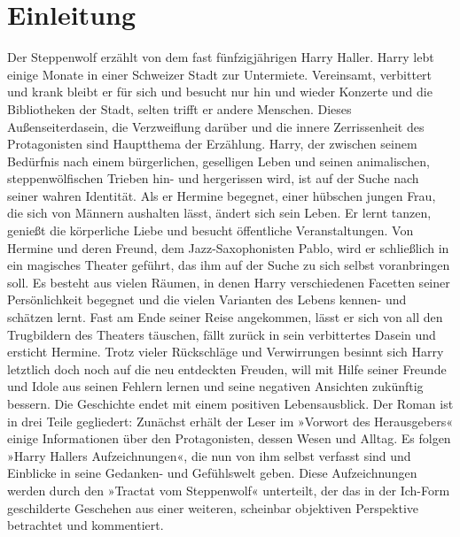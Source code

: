 \documentclass[a4paper,10pt,twocolumn]{article}
\begin{document}
    \section{Einleitung}
    Der Steppenwolf erzählt von dem fast fünfzigjährigen 
    Harry Haller. Harry lebt einige Monate in einer Schweizer Stadt zur Untermiete.
    Vereinsamt, verbittert und krank bleibt er für sich und besucht nur hin und wieder
    Konzerte und die Bibliotheken der Stadt, selten trifft er andere Menschen. Dieses 
    Außenseiterdasein, die Verzweiflung darüber und die innere Zerrissenheit des Protagonisten 
    sind Hauptthema der Erzählung. Harry, der zwischen seinem Bedürfnis nach einem bürgerlichen,
    geselligen Leben und seinen animalischen, steppenwölfischen Trieben hin- und hergerissen wird, 
    ist auf der Suche nach seiner wahren Identität. Als er Hermine begegnet, einer hübschen jungen Frau,
    die sich von Männern aushalten lässt, ändert sich sein Leben. Er lernt tanzen, genießt die körperliche Liebe 
    und besucht öffentliche Veranstaltungen. Von Hermine und deren Freund, dem Jazz-Saxophonisten Pablo,
    wird er schließlich in ein magisches Theater geführt, das ihm auf der Suche zu sich selbst voranbringen soll.
    Es besteht aus vielen Räumen, in denen Harry verschiedenen Facetten seiner Persönlichkeit begegnet und die vielen
    Varianten des Lebens kennen- und schätzen lernt. Fast am Ende seiner Reise angekommen, lässt er sich von all den 
    Trugbildern des Theaters täuschen, fällt zurück in sein verbittertes Dasein und ersticht Hermine.
    Trotz vieler Rückschläge und Verwirrungen besinnt sich Harry letztlich doch noch auf die neu entdeckten Freuden, will mit Hilfe seiner Freunde und Idole aus seinen Fehlern lernen und seine negativen Ansichten zukünftig bessern. Die Geschichte endet mit einem positiven Lebensausblick. Der Roman ist in drei Teile gegliedert: Zunächst erhält der Leser im »Vorwort des Herausgebers« einige Informationen über den Protagonisten, dessen Wesen und Alltag. Es folgen »Harry Hallers Aufzeichnungen«, die nun von ihm selbst verfasst sind und Einblicke in seine Gedanken- und Gefühlswelt geben. Diese Aufzeichnungen werden durch den »Tractat vom Steppenwolf« unterteilt, der das in der Ich-Form geschilderte Geschehen aus einer weiteren, scheinbar objektiven Perspektive betrachtet und kommentiert.
\end{document}

